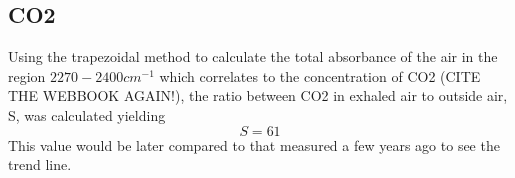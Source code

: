 \documentclass[reprint,amsmath,amssymb,aps, prl]{revtex4-2}
\begin{document}
\subsection{\label{subsec:level20} CO2}
Using the trapezoidal method
to calculate the total absorbance of the air in the region $2270-2400cm^{-1}$ which correlates to the concentration of CO2
(CITE THE WEBBOOK AGAIN!), the ratio between CO2 in exhaled air to outside air, S,  was calculated yielding 
\begin{equation}
\label{eq:CO2ratio}
S=61 %
\end{equation}
This value 
would be later
compared to that measured a few years ago to see the trend line.  
\end{document}
